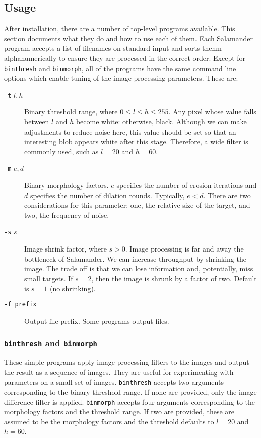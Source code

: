 \documentclass[letter]{article}
\begin{document}
\subsection{Usage} 
After installation, there are a number of top-level programs available. This section
documents what they do and how to use each of them. Each Salamander program accepts a 
list of filenames on standard input and sorts thenm alphanumerically to ensure they are 
processed in the correct order. Except for \texttt{binthresh} and \texttt{binmorph}, 
all of the programs have the same command line options which enable tuning of the 
image processing parameters. These are: 
\begin{description}
  \item[\texttt{-t} $l, h$] Binary threshold range, where $0 \le l \le h \le 255$. Any 
   pixel whose value falls between $l$ and $h$ become white: otherwise, black. Although
   we can make adjustments to reduce noise here, this value should be set so that an 
   interesting blob appears white after this stage. Therefore, a wide filter is commonly 
   used, such as $l=20$ and $h=60$. 
   
  \item[\texttt{-m} $e, d$] Binary morphology factors. $e$ specifies the number of 
   erosion iterations and $d$ specifies the number of dilation rounds. Typically, 
   $e < d$. There are two considerations for this parameter: one, the relative size 
   of the target, and two, the frequency of noise.
   
  \item[\texttt{-s} $s$] Image shrink factor, where $s > 0$. Image processing is far 
   and away the bottleneck of Salamander. We can increase throughput by shrinking the
   image. The trade off is that we can lose information and, potentially, miss small 
   targets. If $s=2$, then the image is shrunk by a factor of two. Default is $s=1$ 
   (no shrinking). 
   
  \item[\texttt{-f prefix}] Output file prefix. Some programs output files. 
\end{description}

\subsubsection{\texttt{binthresh} and \texttt{binmorph}}
These simple programs apply image processing filters to the images and output the
result as a sequence of images. They are useful for experimenting with parameters 
on a small set of images. \texttt{binthresh} accepts two arguments corresponding
to the binary threshold range. If none are provided, only the image difference filter 
is applied. \texttt{binmorph} accepts four arguments  corresponding to the morphology 
factors and the threshold range. If two are provided, these are assumed to be the
morphology factors and the threshold defaults to $l=20$ and $h=60$. 
\end{document}
